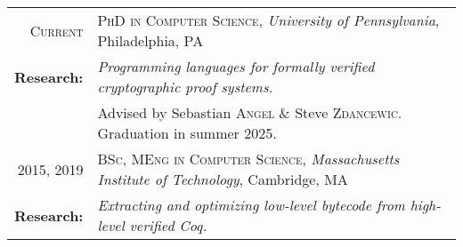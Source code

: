 \begin{tabular}{rl}
\textsc{Current}   & \textsc{PhD in Computer Science}, \emph{University of Pennsylvania}, Philadelphia, PA\\
\textbf{Research:} & \emph{Programming languages for formally verified cryptographic proof systems.} \\
                   & Advised by Sebastian \textsc{Angel} \& Steve \textsc{Zdancewic}. Graduation in summer 2025. \\[0.5em]
2015, 2019         & \textsc{BSc, MEng in Computer Science}, \emph{Massachusetts Institute of Technology}, Cambridge, MA\\
\textbf{Research:} & \emph{Extracting and optimizing low-level bytecode from high-level verified Coq.}
\end{tabular}

